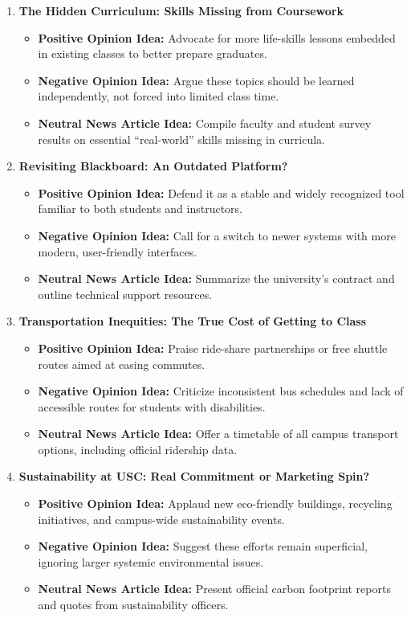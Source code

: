 \documentclass{article}
\begin{document}
\begin{enumerate}
    \item \textbf{The Hidden Curriculum: Skills Missing from Coursework}
    \begin{itemize}
        \item \textbf{Positive Opinion Idea:} Advocate for more life-skills lessons embedded in existing classes to better prepare graduates.
        \item \textbf{Negative Opinion Idea:} Argue these topics should be learned independently, not forced into limited class time.
        \item \textbf{Neutral News Article Idea:} Compile faculty and student survey results on essential “real-world” skills missing in curricula.
    \end{itemize}

    \item \textbf{Revisiting Blackboard: An Outdated Platform?}
    \begin{itemize}
        \item \textbf{Positive Opinion Idea:} Defend it as a stable and widely recognized tool familiar to both students and instructors.
        \item \textbf{Negative Opinion Idea:} Call for a switch to newer systems with more modern, user-friendly interfaces.
        \item \textbf{Neutral News Article Idea:} Summarize the university’s contract and outline technical support resources.
    \end{itemize}

    \item \textbf{Transportation Inequities: The True Cost of Getting to Class}
    \begin{itemize}
        \item \textbf{Positive Opinion Idea:} Praise ride-share partnerships or free shuttle routes aimed at easing commutes.
        \item \textbf{Negative Opinion Idea:} Criticize inconsistent bus schedules and lack of accessible routes for students with disabilities.
        \item \textbf{Neutral News Article Idea:} Offer a timetable of all campus transport options, including official ridership data.
    \end{itemize}

    \item \textbf{Sustainability at USC: Real Commitment or Marketing Spin?}
    \begin{itemize}
        \item \textbf{Positive Opinion Idea:} Applaud new eco-friendly buildings, recycling initiatives, and campus-wide sustainability events.
        \item \textbf{Negative Opinion Idea:} Suggest these efforts remain superficial, ignoring larger systemic environmental issues.
        \item \textbf{Neutral News Article Idea:} Present official carbon footprint reports and quotes from sustainability officers.
    \end{itemize}


\end{enumerate}
\end{document}
